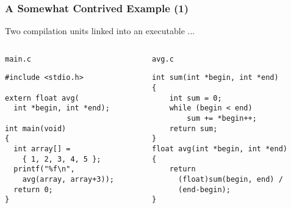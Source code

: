 \begin{frame}[fragile]
  \frametitle{A Somewhat Contrived Example (1)}

  Two compilation units linked into an executable ...

  \begin{columns}[t]

    \begin{column}{.4\textwidth}

      \begin{block}{\texttt{main.c}}
\begin{verbatim}
#include <stdio.h>

extern float avg(
  int *begin, int *end);

int main(void)
{
  int array[] = 
    { 1, 2, 3, 4, 5 };
  printf("%f\n", 
    avg(array, array+3));
  return 0;
}
\end{verbatim}
      \end{block}

    \end{column}

    \begin{column}{.5\textwidth}
      
      \begin{block}{\texttt{avg.c}}
\begin{verbatim}
int sum(int *begin, int *end)
{
    int sum = 0;
    while (begin < end)
        sum += *begin++;
    return sum;
}
float avg(int *begin, int *end)
{
    return
      (float)sum(begin, end) /
      (end-begin);
}
\end{verbatim}
      \end{block}

    \end{column}
  
  \end{columns}

\end{frame}

